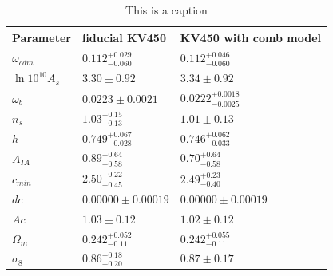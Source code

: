 \documentclass{aa}
\begin{document}
\begin{appendix}
\begin{table}
\begin{tabular}{lll}
\hline
\hline
Parameter & fiducial KV450 & KV450 with comb model\\
\hline
$\omega_{cdm }  $ & $0.112^{+0.029}_{-0.060}   $& $0.112^{+0.046}_{-0.060}   $\\

$\ln10^{10}A_{s }$ & $3.30\pm 0.92              $& $3.34\pm 0.92              $\\

$\omega_{b }    $ & $0.0223\pm 0.0021          $& $0.0222^{+0.0018}_{-0.0025}$\\

$n_{s }         $ & $1.03^{+0.15}_{-0.13}      $& $1.01\pm 0.13              $\\

$h              $ & $0.749^{+0.067}_{-0.028}   $& $0.746^{+0.062}_{-0.033}   $\\
\hline
$A_{IA }        $ & $0.89^{+0.64}_{-0.58}      $& $0.70^{+0.64}_{-0.58}              $\\

$c_{min }       $ & $2.50^{+0.22}_{-0.45}      $& $2.49^{+0.23}_{-0.40}     $\\

$dc             $ & $0.00000\pm 0.00019        $& $0.00000\pm 0.00019        $\\

$Ac             $ & $1.03\pm 0.12              $& $1.02\pm 0.12              $\\

$\Omega_{m }    $ & $0.242^{+0.052}_{-0.11}    $& $0.242^{+0.055}_{-0.11}    $\\

$\sigma_8        $ & $0.86^{+0.18}_{-0.20}      $& $0.87\pm 0.17      $\\
\hline
\end{tabular}
\caption{{\color{red} This is a caption}}
\label{tab:consistency}
\end{table}
\end{appendix}
%
%
\end{document}
